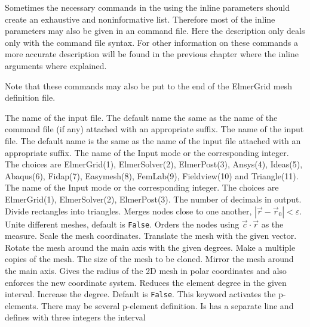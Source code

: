 Sometimes the necessary commands in the using the inline parameters
should create an exhaustive and noninformative list. Therefore most of the
inline parameters may also be given in an command file.
Here the description only deals only with the command file
syntax. For other information on these commands a more accurate description will 
be found in the previous chapter where the inline arguments where explained.

Note that these commands may also be put to the end of the ElmerGrid mesh 
definition file.

\sifbegin
{}
The name of the input file.
The default name the same as the name of the command file (if any) 
attached with an appropriate suffix. 
%
The name of the input file.
The default name is the same as the name of the input file
attached with an appropriate suffix. 
%
The name of the Input mode or the corresponding integer. 
The choices are ElmerGrid(1), ElmerSolver(2), ElmerPost(3), 
Ansys(4), Ideas(5), Abaqus(6), Fidap(7), Easymesh(8), 
FemLab(9), Fieldview(10) and Triangle(11).
%
The name of the Input mode or the corresponding integer. 
The choices are ElmerGrid(1), ElmerSolver(2), ElmerPost(3).
%
The number of decimals in output.
%
Divide rectangles into triangles.
%
Merges nodes close to one another, $|\vec{r}-\vec{r}_0| < \varepsilon$.
%
Unite different meshes, default is \texttt{False}.
%
Orders the nodes using $\vec{c}\cdot\vec{r}$ as the measure.
%
Scale the mesh coordinates. 
%
Translate the mesh with the given vector.
%
Rotate the mesh around the main axis with the given degrees.
%
Make a multiple copies of the mesh.
%
The size of the mesh to be cloned.
%
Mirror the mesh around the main axis.
%
Gives the radius of the 2D mesh in polar coordinates 
and also enforces the new coordinate system.
%
Reduces the element degree in the given interval.
%
Increase the degree. Default is \texttt{False}.
%
This keyword activates the p-elements. 
There may be several p-element definition. Is 
has a separate line and defines with three integers the interval
